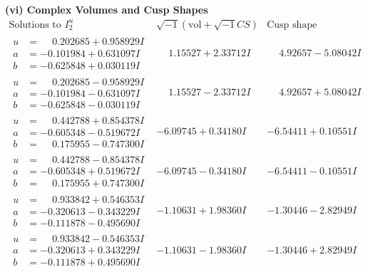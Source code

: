 \documentclass[1p]{elsarticle_modified}
\theoremstyle{definition}
\newcommand{\I}{\sqrt{-1}}
\begin{document}
\newpage\flushleft \textbf{(vi) Complex Volumes and Cusp Shapes}
$$\begin{array}{c|c|c}  
\text{Solutions to }I^u_{2}& \I (\text{vol} + \sqrt{-1}CS) & \text{Cusp shape}\\
 \hline 
\begin{aligned}
u &= \phantom{-}0.202685 + 0.958929 I \\
a &= -0.101984 + 0.631097 I \\
b &= -0.625848 + 0.030119 I\end{aligned}
 & \phantom{-}1.15527 + 2.33712 I & \phantom{-}4.92657 - 5.08042 I \\ \hline\begin{aligned}
u &= \phantom{-}0.202685 - 0.958929 I \\
a &= -0.101984 - 0.631097 I \\
b &= -0.625848 - 0.030119 I\end{aligned}
 & \phantom{-}1.15527 - 2.33712 I & \phantom{-}4.92657 + 5.08042 I \\ \hline\begin{aligned}
u &= \phantom{-}0.442788 + 0.854378 I \\
a &= -0.605348 - 0.519672 I \\
b &= \phantom{-}0.175955 - 0.747300 I\end{aligned}
 & -6.09745 + 0.34180 I & -6.54411 + 0.10551 I \\ \hline\begin{aligned}
u &= \phantom{-}0.442788 - 0.854378 I \\
a &= -0.605348 + 0.519672 I \\
b &= \phantom{-}0.175955 + 0.747300 I\end{aligned}
 & -6.09745 - 0.34180 I & -6.54411 - 0.10551 I \\ \hline\begin{aligned}
u &= \phantom{-}0.933842 + 0.546353 I \\
a &= -0.320613 - 0.343229 I \\
b &= -0.111878 - 0.495690 I\end{aligned}
 & -1.10631 + 1.98360 I & -1.30446 - 2.82949 I \\ \hline\begin{aligned}
u &= \phantom{-}0.933842 - 0.546353 I \\
a &= -0.320613 + 0.343229 I \\
b &= -0.111878 + 0.495690 I\end{aligned}
 & -1.10631 - 1.98360 I & -1.30446 + 2.82949 I \\ \hline\begin{aligned}

\end{aligned}
\end{array}$$
\end{document}
